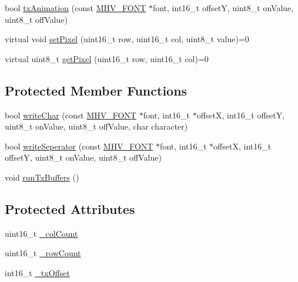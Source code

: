 \begin{DoxyCompactItemize}
\item 
bool \hyperlink{class_m_h_v___display___monochrome_aae1f1c81f5cb08d6a318d9b3d1122d28}{tx\-Animation} (const \hyperlink{_m_h_v___font_8h_ab7088ba808ac223275dfd526d198356f}{\-M\-H\-V\-\_\-\-F\-O\-N\-T} $\ast$font, int16\-\_\-t offset\-Y, uint8\-\_\-t on\-Value, uint8\-\_\-t off\-Value)
\item 
virtual void \hyperlink{class_m_h_v___display___monochrome_a58a17e8662802e7f5d6ccd6f0bcc51a0}{set\-Pixel} (uint16\-\_\-t row, uint16\-\_\-t col, uint8\-\_\-t value)=0
\item 
virtual uint8\-\_\-t \hyperlink{class_m_h_v___display___monochrome_a80573e21b6b455fdd79c9d7d0a981492}{get\-Pixel} (uint16\-\_\-t row, uint16\-\_\-t col)=0
\end{DoxyCompactItemize}
\subsection*{\-Protected \-Member \-Functions}
\begin{DoxyCompactItemize}
\item 
bool \hyperlink{class_m_h_v___display___monochrome_a271af24e97bbf0e7c8df0d4e15853473}{write\-Char} (const \hyperlink{_m_h_v___font_8h_ab7088ba808ac223275dfd526d198356f}{\-M\-H\-V\-\_\-\-F\-O\-N\-T} $\ast$font, int16\-\_\-t $\ast$offset\-X, int16\-\_\-t offset\-Y, uint8\-\_\-t on\-Value, uint8\-\_\-t off\-Value, char character)
\item 
bool \hyperlink{class_m_h_v___display___monochrome_a232ae179856cab71ed0f1a73f6312af5}{write\-Seperator} (const \hyperlink{_m_h_v___font_8h_ab7088ba808ac223275dfd526d198356f}{\-M\-H\-V\-\_\-\-F\-O\-N\-T} $\ast$font, int16\-\_\-t $\ast$offset\-X, int16\-\_\-t offset\-Y, uint8\-\_\-t on\-Value, uint8\-\_\-t off\-Value)
\item 
void \hyperlink{class_m_h_v___display___monochrome_a7abdfbe71e00421a4275760ab6632b4a}{run\-Tx\-Buffers} ()
\end{DoxyCompactItemize}
\subsection*{\-Protected \-Attributes}
\begin{DoxyCompactItemize}
\item 
uint16\-\_\-t \hyperlink{class_m_h_v___display___monochrome_ae34bd61b8cffa2ee240bfe29f49a99d2}{\-\_\-col\-Count}
\item 
uint16\-\_\-t \hyperlink{class_m_h_v___display___monochrome_a29a7a7b8ceaf0ce0087002b9458d5074}{\-\_\-row\-Count}
\item 
int16\-\_\-t \hyperlink{class_m_h_v___display___monochrome_a75607cd77067ab059e8962e666593d4e}{\-\_\-tx\-Offset}
\end{DoxyCompactItemize}


